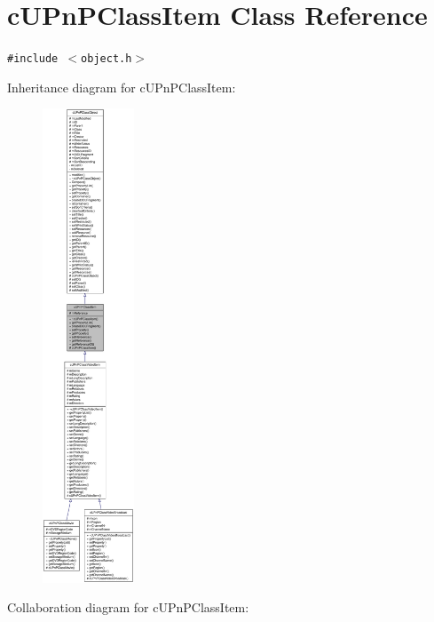 \hypertarget{classcUPnPClassItem}{
\section{cUPnPClassItem Class Reference}
\label{classcUPnPClassItem}
}
{\tt \#include $<$object.h$>$}

Inheritance diagram for cUPnPClassItem:\nopagebreak
\begin{figure}[H]
\begin{center}
\leavevmode
\includegraphics[height=400pt]{classcUPnPClassItem__inherit__graph}
\end{center}
\end{figure}
Collaboration diagram for cUPnPClassItem:\nopagebreak

